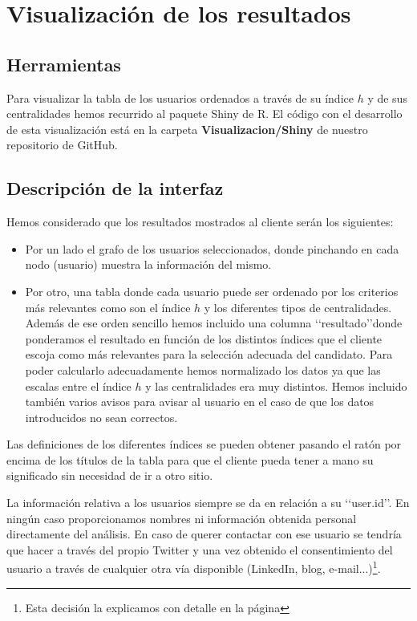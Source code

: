 \chapter{Visualizaci\'on de los resultados}
\label{chap:visualizacion}
\section{Herramientas}
Para visualizar la tabla de los usuarios ordenados a través de su índice $h$ y de sus centralidades
hemos recurrido al paquete Shiny de R. El código con el desarrollo de esta visualización
está en la carpeta {\bf Visualizacion/Shiny} de nuestro repositorio de GitHub.

\section{Descripción de la interfaz}
Hemos considerado que los resultados mostrados al cliente serán los siguientes:
\begin{itemize}
\item Por un lado el grafo de los usuarios seleccionados, donde pinchando en cada nodo (usuario) 
muestra la información del mismo.
\item Por otro, una tabla donde cada usuario puede ser ordenado por los criterios más relevantes 
como son el índice $h$ y los diferentes tipos de centralidades. Además de ese orden sencillo 
hemos incluido una columna \lq\lq resultado\rq\rq donde ponderamos el resultado en función de los 
distintos índices que el cliente escoja como más relevantes para la selección adecuada del 
candidato. Para poder calcularlo adecuadamente hemos normalizado los datos ya que las escalas 
entre el índice $h$ y las centralidades era muy distintos. Hemos incluido también varios 
avisos para avisar al usuario en el caso de que los datos introducidos no sean correctos. 
\end{itemize}


Las definiciones de los diferentes índices se pueden obtener pasando el ratón por encima 
de los títulos de la tabla para que el cliente pueda tener a mano su significado sin necesidad 
de ir a otro sitio.


La información relativa a los usuarios siempre se da en relación a su \lq\lq user.id\rq\rq. 
En ningún caso proporcionamos nombres ni información obtenida personal directamente del análisis. 
En caso de querer contactar con ese usuario se tendría que hacer a través del propio Twitter y 
una vez obtenido el consentimiento del usuario a través de cualquier otra vía disponible 
(LinkedIn, blog, e-mail...)\footnote{Esta decisión la explicamos con detalle en la página 
\pageref{note:why_only_user_id}}. 


